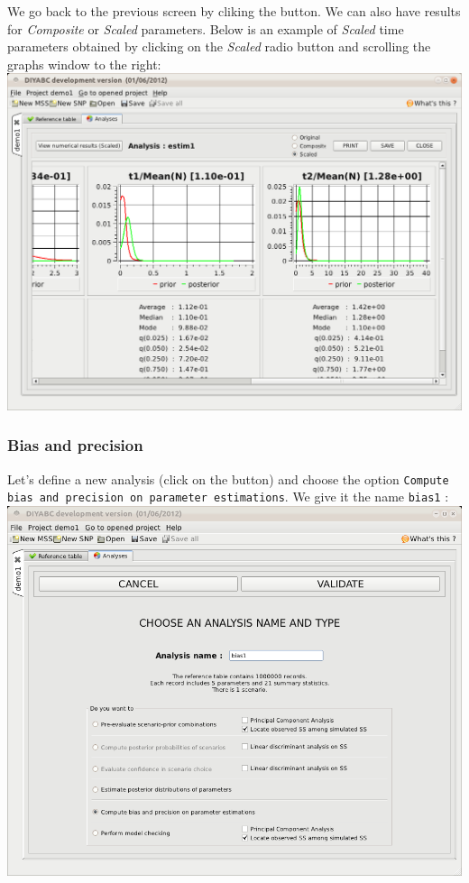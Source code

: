 We go back to the previous screen by cliking the  button.
\newpage
 We can also have results for \emph{Composite} or \emph{Scaled} parameters. Below is an example of \emph{Scaled} time parameters obtained by clicking on the \emph{Scaled} radio button and scrolling the graphs window to the right:\\
 
\includegraphics[scale=0.35]{gui_pictures/Capture-DIYABC-42.png} \\


\subsubsection{Bias and precision}
Let's define a new analysis (click on the  button) and choose the option \texttt{Compute bias and precision on parameter estimations}. We give it the name \texttt{bias1} :\\

\includegraphics[scale=0.35]{gui_pictures/Capture-DIYABC-43.png} \\

